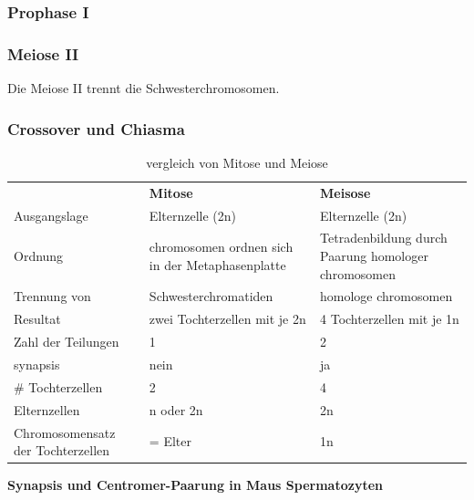 \subsubsection*{Prophase I}

\subsubsection*{Meiose II}
Die Meiose II trennt die Schwesterchromosomen.


\subsubsection{Crossover und Chiasma}


\begin{table}[H]
    \centering
    \begin{tabular}{p{2cm} p{5cm} p{5cm}}
       & \textbf{Mitose} & \textbf{Meisose} \\
      Ausgangslage &   Elternzelle (2n) & Elternzelle (2n) \\
        Ordnung & \gls{chromosom}en ordnen sich in der
        Metaphasenplatte & Tetradenbildung durch Paarung
        homologer \gls{chromosom}en \\
        Trennung von & Schwesterchromatiden & homologe \gls{chromosom}en \\
        Resultat & zwei Tochterzellen
        mit je 2n & 4 Tochterzellen
        mit je 1n \\
       Zahl der Teilungen & 1 & 2 \\
        \gls{synapsis} & nein & ja \\
        \# Tochterzellen & 2 & 4 \\
       Elternzellen & n oder 2n & 2n \\
       Chromosomensatz
       der Tochterzellen & = Elter & 1n
    \end{tabular}
    \caption{vergleich von Mitose und Meiose}
\end{table}



\begin{bsp}
    \textbf{Synapsis und Centromer-Paarung in Maus Spermatozyten}
\end{bsp}

